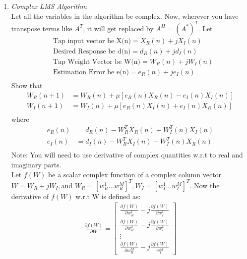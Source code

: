 \documentclass[journal,12pt,twocolumn]{IEEEtran}
\begin{document}
\section{}
\begin{enumerate}
\item \textit{Complex LMS Algorithm}\\
Let all the variables in the algorithm be complex. Now, wherever  you have transpose terms like $A^T$, it will get replaced by $A^H={(A^*)}^T$. Let\\
\begin{align*}
&\text{Tap input vector be X(n)}={X_R}(n)+j{X_I}(n)\\
&\text{Desired Response be d(n)}={d_R}(n)+jd_I(n)\\
&\text{Tap Weight Vector be W(n)}={W_R}(n)+j{W_I}(n)\\
&\text{Estimation Error be e(n)}=e_R(n)+j{e_I}(n)\\    
\end{align*}
\medskip
Show that
\begin{align*}
W_R(n+1)& ={W_R}(n)+\mu[e_R(n)X_R(n)-e_I(n)X_I(n)]\\
W_I(n+1)& =W_I(n)+\mu[e_R(n)X_I(n)+e_I(n)X_R(n)]\\
\end{align*}
where
\begin{align*}
e_R(n)& =d_R(n)-W_{R}^{T}{X_R(n)}+W_{I}^{T}(n)X_I(n)\\
e_I(n)& =d_I(n)-W_{R}^{T}{X_I(n)}-W_{I}^{T}(n){X_R(n)}\\
\end{align*}
\smallskip
Note: You will need to use derivative of complex quantities w.r.t to real and imaginary parts.\\
Let $f(W)$ be a scalar complex function of a complex column vector $W=W_R+jW{_I},$and $W_R=[w_{R}^{1}...w_{R}^{M}]^T,W_I=[w_{I}^{1}...w_{I}^{M}]^T.$ Now the derivative of $f(W)$ w.r.t W is defined as:
\bigskip
\begin{align*}
\frac{\partial{f(W)}}{\partial{W}}=\begin{bmatrix}{\frac{\partial{f(W)}}{\partial{w}_R^1}}-{j\frac{\partial{f(W)}}{\partial{w}_I^1}} \\[12pt]
{\frac{\partial{f(W)}}{\partial{w}_R^2}}-{j\frac{\partial{f(W)}}{\partial{w}_I^2}} \\
\vdots \\
{\frac{\partial{f(W)}}{\partial{w}_R^M}}-{j\frac{\partial{f(W)}}{{w}_I^M}}
\end{bmatrix}
\end{align*}

\end{enumerate}
\end{document}
